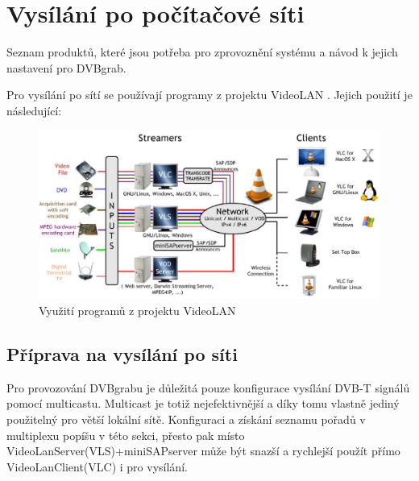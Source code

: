 
\chapter{Vysílání po počítačové síti}

Seznam produktů, které jsou potřeba pro zprovoznění systému a návod k jejich nastavení pro DVBgrab.

\vspace{10pt}

Pro vysílání po sítí se používají programy z projektu VideoLAN \cite{videolanURL}. Jejich použití je následující:

\vspace{10pt}

\begin{figure}[h]
\begin{center}
\includegraphics[width=15cm]{images/videolan.eps}
\caption{Využití programů z projektu VideoLAN}
\label{fig:videolan}
\end{center}
\end{figure}

\vspace{10pt}

\section{Příprava na vysílání po síti}


\vspace{10pt}

Pro provozování DVBgrabu je důležitá pouze konfigurace vysílání DVB-T signálů pomocí multicastu. Multicast je totiž nejefektivnější a díky tomu vlastně jediný použitelný pro větší lokální sítě. Konfiguraci a získání seznamu pořadů v multiplexu popíšu v této sekci, přesto pak místo VideoLanServer(VLS)+miniSAPserver může být snazší a rychlejší použít přímo VideoLanClient(VLC) i pro vysílání.

